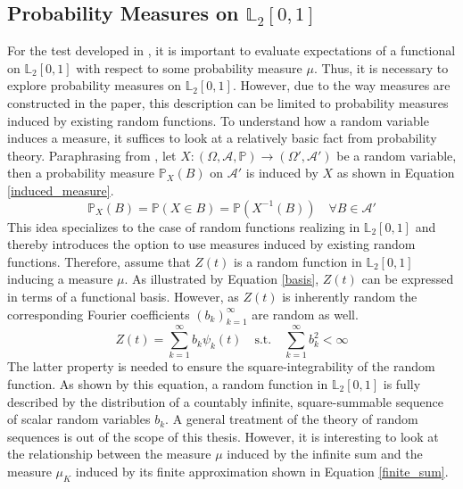 \documentclass[12pt, a4paper]{article}
\theoremstyle{MAstyle} \newtheorem{assumption}{Assumption}[section]
\theoremstyle{MAstyle} \newtheorem{definition}{Definition}[section]
\theoremstyle{MAstyle} \newtheorem{theorem}{Theorem}[section]
\begin{document}
		\subsection{Probability Measures on $\mathbb{L}_2[0,1]$}\label{prob_measures_l2}
			For the test developed in \cite{bugni_permutation_2021}, it is important to evaluate expectations of a functional on $\mathbb{L}_2[0,1]$ with respect to some probability measure $\mu$. Thus, it is necessary to explore probability measures on $\mathbb{L}_2[0,1]$. However, due to the way measures are constructed in the paper, this description can be limited to probability measures induced by existing random functions. 
			To understand how a random variable induces a measure, it suffices to look at a relatively basic fact from probability theory. Paraphrasing from \cite{bauer_probability_2011}, let $X:\left(\Omega, \mathcal{A}, \mathbb{P}\right) \rightarrow \left(\Omega', \mathcal{A}'\right)$ be a random variable, then a probability measure $\mathbb{P}_X(B)$ on $\mathcal{A}'$ is induced by $X$ as shown in Equation \ref{induced_measure}.
			\begin{equation}\label{induced_measure}
				\mathbb{P}_X(B) = \mathbb{P}(X \in B) = \mathbb{P}(X^{-1}(B)) \quad \forall B \in \mathcal{A}'
			\end{equation}
			This idea specializes to the case of random functions realizing in $\mathbb{L}_2[0,1]$ and thereby introduces the option to use measures induced by existing random functions.
			Therefore, assume that $Z(t)$ is a random function in $\mathbb{L}_2[0,1]$ inducing a measure $\mu$. As illustrated by Equation \ref{basis}, $Z(t)$ can be expressed in terms of a functional basis. However, as $Z(t)$ is inherently random the corresponding Fourier coefficients $\left(b_k\right)_{k = 1}^{\infty}$ are random as well.
			\begin{equation}
				Z(t) = \sum_{k = 1}^{\infty} b_k \psi_k(t) \quad \text{s.t.} \quad \sum_{k = 1}^{\infty} b_k^2 < \infty
			\end{equation}
			The latter property is needed to ensure the square-integrability of the random function. As shown by this equation, a random function in $\mathbb{L}_2[0,1]$ is fully described by the distribution of a countably infinite, square-summable sequence of scalar random variables $b_k$. A general treatment of the theory of random sequences is out of the scope of this thesis. However, it is interesting to look at the relationship between the measure $\mu$ induced by the infinite sum and the measure $\mu_K$ induced by its finite approximation shown in Equation \ref{finite_sum}.
\end{document}
